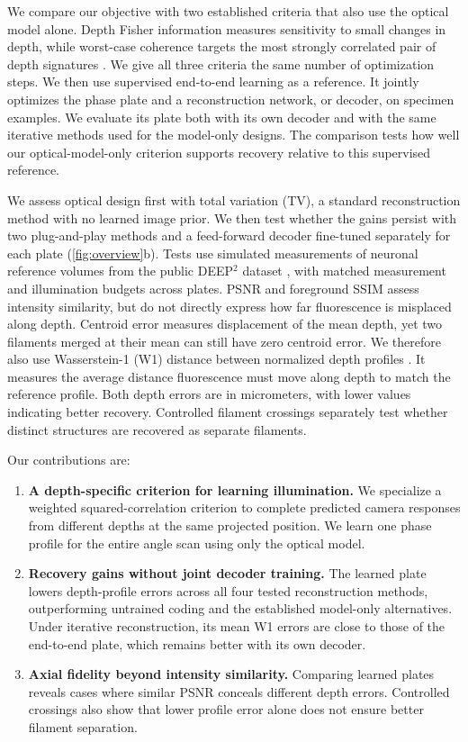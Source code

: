 We compare our objective with two established criteria that also use the optical model alone. Depth Fisher information measures sensitivity to small changes in depth, while worst-case coherence targets the most strongly correlated pair of depth signatures \cite{shechtman2014,elad2007}. We give all three criteria the same number of optimization steps. We then use supervised end-to-end learning as a reference. It jointly optimizes the phase plate and a reconstruction network, or decoder, on specimen examples. We evaluate its plate both with its own decoder and with the same iterative methods used for the model-only designs. The comparison tests how well our optical-model-only criterion supports recovery relative to this supervised reference.

We assess optical design first with total variation (TV), a standard reconstruction method with no learned image prior. We then test whether the gains persist with two plug-and-play methods and a feed-forward decoder fine-tuned separately for each plate (\cref{fig:overview}b). Tests use simulated measurements of neuronal reference volumes from the public DEEP$^2$ dataset \cite{wijethilake2023,wijethilake2023data}, with matched measurement and illumination budgets across plates. PSNR and foreground SSIM assess intensity similarity, but do not directly express how far fluorescence is misplaced along depth. Centroid error measures displacement of the mean depth, yet two filaments merged at their mean can still have zero centroid error. We therefore also use Wasserstein-1 (W1) distance between normalized depth profiles \cite{peyre2019}. It measures the average distance fluorescence must move along depth to match the reference profile. Both depth errors are in micrometers, with lower values indicating better recovery. Controlled filament crossings separately test whether distinct structures are recovered as separate filaments.

Our contributions are:
\begin{enumerate}\itemsep0pt
\item \textbf{A depth-specific criterion for learning illumination.} We specialize a weighted squared-correlation criterion to complete predicted camera responses from different depths at the same projected position. We learn one phase profile for the entire angle scan using only the optical model.
\item \textbf{Recovery gains without joint decoder training.} The learned plate lowers depth-profile errors across all four tested reconstruction methods, outperforming untrained coding and the established model-only alternatives. Under iterative reconstruction, its mean W1 errors are close to those of the end-to-end plate, which remains better with its own decoder.
\item \textbf{Axial fidelity beyond intensity similarity.} Comparing learned plates reveals cases where similar PSNR conceals different depth errors. Controlled crossings also show that lower profile error alone does not ensure better filament separation.
\end{enumerate}
